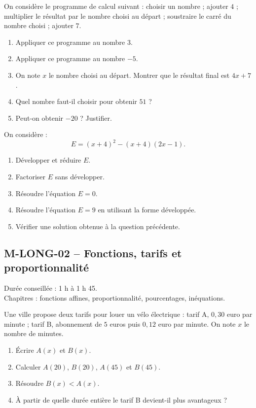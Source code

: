 \documentclass[11pt,a4paper]{article}
\newcounter{exercice}
\begin{document}
\begin{exercice}
On considère le programme de calcul suivant : choisir un nombre ; ajouter $4$ ; multiplier le résultat par le nombre choisi au départ ; soustraire le carré du nombre choisi ; ajouter $7$.
\begin{enumerate}
  \item Appliquer ce programme au nombre $3$.
  \item Appliquer ce programme au nombre $-5$.
  \item On note $x$ le nombre choisi au départ. Montrer que le résultat final est $4x+7$.
  \item Quel nombre faut-il choisir pour obtenir $51$ ?
  \item Peut-on obtenir $-20$ ? Justifier.
\end{enumerate}
\end{exercice}

\begin{exercice}
On considère :
\[
E=(x+4)^2-(x+4)(2x-1).
\]
\begin{enumerate}
  \item Développer et réduire $E$.
  \item Factoriser $E$ sans développer.
  \item Résoudre l'équation $E=0$.
  \item Résoudre l'équation $E=9$ en utilisant la forme développée.
  \item Vérifier une solution obtenue à la question précédente.
\end{enumerate}
\end{exercice}
\newpage
\subsection{M-LONG-02 -- Fonctions, tarifs et proportionnalité}

\begin{objectif}
Durée conseillée : 1 h à 1 h 45.\\
Chapitres : fonctions affines, proportionnalité, pourcentages, inéquations.
\end{objectif}
\begin{exercice}
Une ville propose deux tarifs pour louer un vélo électrique : tarif A, $0{,}30$ euro par minute ; tarif B, abonnement de $5$ euros puis $0{,}12$ euro par minute. On note $x$ le nombre de minutes.
\begin{enumerate}
  \item Écrire $A(x)$ et $B(x)$.
  \item Calculer $A(20)$, $B(20)$, $A(45)$ et $B(45)$.
  \item Résoudre $B(x)<A(x)$.
  \item À partir de quelle durée entière le tarif B devient-il plus avantageux ?
\end{enumerate}
\end{exercice}
\end{document}
